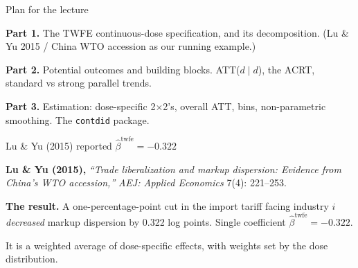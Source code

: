 \documentclass[aspectratio=169,12pt,t]{beamer}
\begin{document}
\begin{frame}{Plan for the lecture}
\vspace{0.2cm}

\textbf{Part 1.} \;The TWFE continuous-dose specification, and its decomposition. \;(Lu \& Yu 2015 / China WTO accession as our running example.)

\vspace{0.4cm}

\textbf{Part 2.} \;Potential outcomes and building blocks. \;ATT($d \mid d$), the ACRT, standard vs strong parallel trends.

\vspace{0.4cm}

\textbf{Part 3.} \;Estimation: \;dose-specific 2$\times$2's, overall ATT, bins, non-parametric smoothing. \;The \texttt{contdid} package.

\vspace{0.5em}
\end{frame}



\begin{frame}{Lu \& Yu (2015) reported $\widehat{\beta}^{\text{twfe}} = -0.322$}
\vspace{0.2cm}

\textbf{Lu \& Yu (2015),} \;\textit{``Trade liberalization and markup dispersion: Evidence from China's WTO accession,''} \;\textit{AEJ: Applied Economics} 7(4): 221--253.

\vspace{0.5cm}

\textbf{The result.} \;A one-percentage-point cut in the import tariff facing industry $i$ \textit{decreased} markup dispersion by 0.322 log points. \;Single coefficient $\widehat\beta^{\text{twfe}} = -0.322$.

\vspace{0.5cm}

 \;It is a weighted average of dose-specific effects, with weights set by the dose distribution.

\vspace{0.4em}
\end{frame}
\end{document}
